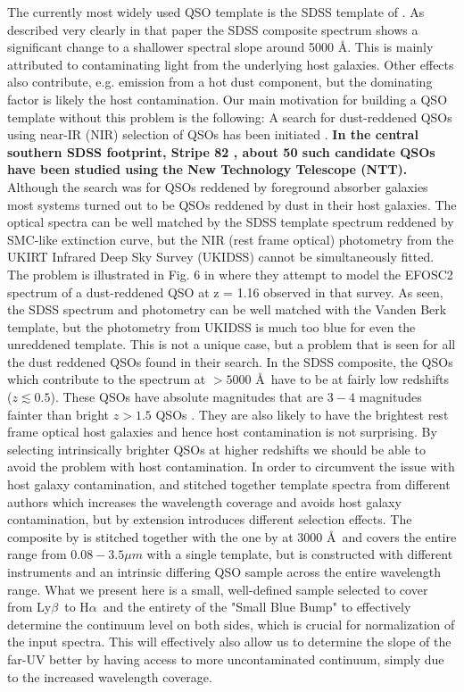 \documentclass{aa}    %
\newcommand{\lyb}{Ly$\beta$}
\newcommand{\ha}{H$\alpha$}
\begin{document}
The currently most widely used QSO template is the SDSS template of
\citet{VandenBerk2001}. As described very clearly in that paper the
SDSS composite spectrum shows a significant change to a shallower
spectral slope around 5000 \AA. This is mainly attributed to
contaminating light from the underlying host galaxies. Other effects
also contribute, e.g. emission from a hot dust component, but the
dominating factor is likely the host contamination. Our main
motivation for building a QSO template without this problem is the
following: A search for dust-reddened QSOs using
near-IR (NIR) selection of QSOs has been initiated \citep{Fynbo2013, Krogager2015}. 
\textbf{In the central southern SDSS footprint, Stripe 82 \citep{Annis2014}, about 50 such candidate QSOs have been studied using the
New Technology Telescope (NTT).} Although the search was for QSOs reddened by foreground absorber
galaxies most systems turned out to be QSOs reddened by dust in their
host galaxies. The optical spectra can be well matched by the SDSS
template spectrum reddened by SMC-like extinction curve, but the NIR
(rest frame optical) photometry from the UKIRT Infrared Deep Sky Survey (UKIDSS) cannot be simultaneously
fitted. The problem is illustrated in Fig. 6 in \citet{Fynbo2013}
where they attempt to model the EFOSC2 spectrum of a dust-reddened QSO
at z = 1.16 observed in that survey. As seen, the SDSS spectrum and
photometry can be well matched with the Vanden Berk template, but the
photometry from UKIDSS is much too blue for even the unreddened
template. This is not a unique case, but a problem that is seen for
all the dust reddened QSOs found in their search.  In the SDSS
composite, the QSOs which contribute to the spectrum at $ > 5000$
\AA~have to be at fairly low redshifts ($z \lesssim 0.5$). These QSOs
have absolute magnitudes that are $3-4$ magnitudes fainter than bright
$z > 1.5$ QSOs \citep[e.g.,][their Fig.~1]{VandenBerk2001}. They are
also likely to have the brightest rest frame optical host galaxies and
hence host contamination is not surprising. By selecting intrinsically
brighter QSOs at higher redshifts we should be able to avoid the
problem with host contamination.  In order to circumvent the issue
with host galaxy contamination, \citet{Fynbo2013} and
\citet{Krogager2015} stitched together template spectra from different
authors which increases the wavelength coverage and avoids host galaxy
contamination, but by extension introduces different selection
effects. The composite by \citet{Glikman2006} is stitched together
with the one by \citet{VandenBerk2001} at $3000$ \AA~and covers the
entire range from $0.08 - 3.5 \mu m$ with a single template, but is
constructed with different instruments and an intrinsic differing QSO
sample across the entire wavelength range.  What we present here is a
small, well-defined sample selected to cover from \lyb~to \ha~and the
entirety of the "Small Blue Bump" to effectively determine the
continuum level on both sides, which is crucial for normalization of
the input spectra. This will effectively also allow us to determine
the slope of the far-UV better by having access to more uncontaminated
continuum, simply due to the increased wavelength coverage.
\end{document}
